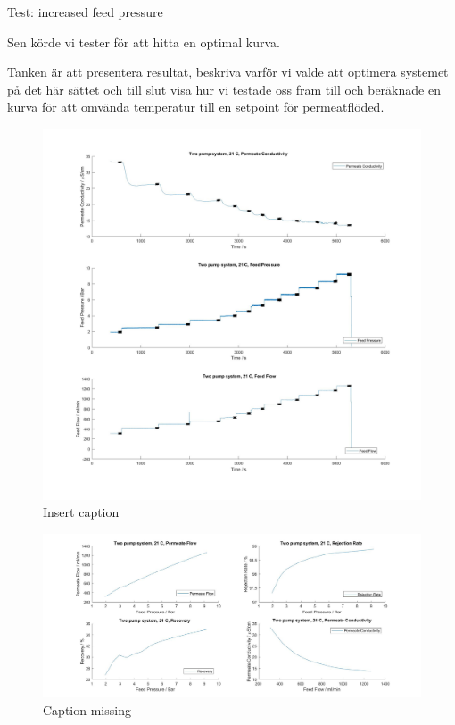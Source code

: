 Test: increased feed pressure


Sen körde vi tester för att hitta en optimal kurva.

Tanken är att presentera resultat, beskriva varför vi valde att optimera systemet på det här sättet och till slut visa hur vi testade oss fram till och beräknade en kurva för att omvända temperatur till en setpoint för permeatflöded.

\begin{figure}[H]
    \centering
    \includegraphics[width=1.1\textwidth]{FeedPumpIncrease21}
    \caption{Insert caption}
    \label{fig:PressConn}
\end{figure}


\begin{figure}[H]
    \centering
    \includegraphics[width=1.1\textwidth]{FeedPumpIncrease21Key}
    \caption{Caption missing}
    \label{fig:PressConn}
\end{figure}

